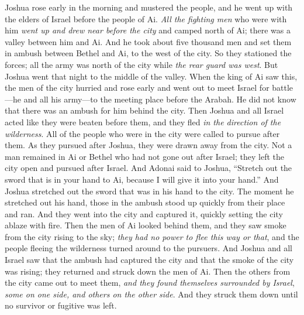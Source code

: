 \begin{biblechapter}
\verse Joshua rose early in the morning and mustered the people, and he went up with the elders of Israel before the people of Ai.
\verse \textit{All the fighting men} who were with him \textit{went up and drew near before the city} and camped north of Ai; there was a valley between him and Ai.
\verse And he took about five thousand men and set them in ambush between Bethel and Ai, to the west of the city.
\verse So they stationed the forces; all the army was north of the city while \textit{the rear guard was west}. But Joshua went that night to the middle of the valley.
\verse When the king of Ai saw this, the men of the city hurried and rose early and went out to meet Israel for battle—he and all his army—to the meeting place before the Arabah. He did not know that there was an ambush for him behind the city.
\verse Then Joshua and all Israel acted like they were beaten before them, and they fled \textit{in the direction of the wilderness}.
\verse All of the people who were in the city were called to pursue after them. As they pursued after Joshua, they were drawn away from the city.
\verse Not a man remained in Ai or Bethel who had not gone out after Israel; they left the city open and pursued after Israel.
\verse And Adonai said to Joshua, “Stretch out the sword that is in your hand to Ai, because I will give it into your hand.” And Joshua stretched out the sword that was in his hand to the city.
\verse The moment he stretched out his hand, those in the ambush stood up quickly from their place and ran. And they went into the city and captured it, quickly setting the city ablaze with fire.
\verse Then the men of Ai looked behind them, and they saw smoke from the city rising to the sky; \textit{they had no power to flee this way or that}, and the people fleeing the wilderness turned around to the pursuers.
\verse And Joshua and all Israel saw that the ambush had captured the city and that the smoke of the city was rising; they returned and struck down the men of Ai.
\verse Then the others from the city came out to meet them, \textit{and they found themselves surrounded by Israel}, \textit{some on one side, and others on the other side}. And they struck them down until no survivor or fugitive was left.

\end{biblechapter}
